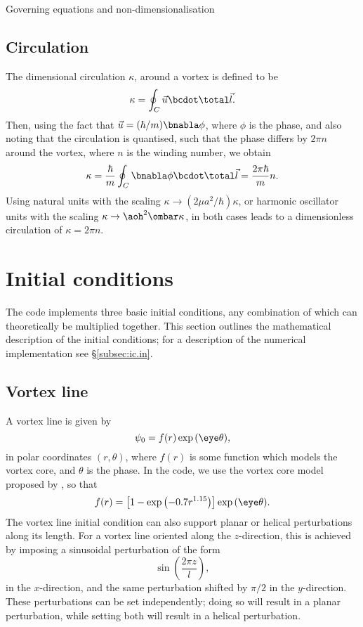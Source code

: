 \begin{chapter}{\label{cha:equations}Governing equations and
  non-dimensionalisation}
  \subsection{Circulation}
  The dimensional circulation $\kappa$, around a vortex is defined to be
  \begin{equation*}
    \kappa = \oint_{C}{\vec{u}\bcdot\total\vec{l}}.
  \end{equation*}
  Then, using the fact that $\vec{u} = (\hbar/m)\bnabla\phi$, where $\phi$ is
  the phase, and also noting that the circulation is quantised, such that the
  phase differs by $2\pi n$ around the vortex, where $n$ is the winding number,
  we obtain
  \begin{equation*}
    \kappa = \frac{\hbar}{m} \oint_{C}{\bnabla\phi\bcdot\total\vec{l}} =
    \frac{2\pi\hbar}{m}n.
  \end{equation*}
  Using natural units with the scaling $\kappa \to (2\mu a^{2}/\hbar)\kappa$,
  or harmonic oscillator units with the scaling $\kappa \to
  \aoh^{2}\ombar\kappa$, in both cases leads to a dimensionless circulation of
  $\kappa = 2\pi n$.

  \section{Initial conditions}
  The code implements three basic initial conditions, any combination of which
  can theoretically be multiplied together.  This section outlines the
  mathematical description of the initial conditions; for a description of the
  numerical implementation see \S\ref{subsec:ic.in}.

  \subsection{Vortex line}
  A vortex line is given by
  \begin{equation*}
    \psi_{0} = f(r) \exp{(\eye \theta)},
  \end{equation*}
  in polar coordinates $(r, \theta)$, where $f(r)$ is some function which
  models the vortex core, and $\theta$ is the phase.  In the code, we use the
  vortex core model proposed by \citet{BR01}, so that
  \begin{equation*}
    f(r) = \left[ 1 - \exp{\left( -0.7r^{1.15}\right)} \right] \exp{(\eye
    \theta)}.
  \end{equation*}
  The vortex line initial condition can also support planar or helical
  perturbations along its length.  For a vortex line oriented along the
  $z$-direction, this is achieved by imposing a sinusoidal
  perturbation of the form
  \begin{equation*}
    \sin{\left( \frac{2\pi z}{l} \right)},
  \end{equation*}
  in the $x$-direction, and the same perturbation shifted by $\pi/2$ in the
  $y$-direction.  These perturbations can be set independently; doing so will
  result in a planar perturbation, while setting both will result in a helical
  perturbation.


\end{chapter}
